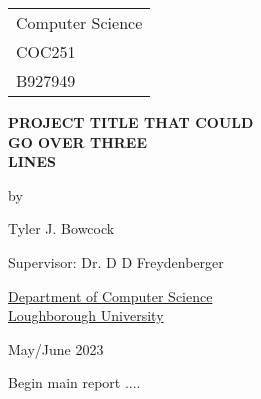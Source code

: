 \documentclass[a4paper]{report}
\begin{document}


\thispagestyle{empty}

\fancypage{}{\fbox}

\begin{center}

\Large{
\hfill \begin{tabular}{l}
Computer Science \\
COC251 \\
B927949
\end{tabular}
}


\vspace*{\fill}

\Large{\textbf{PROJECT TITLE THAT COULD \\
GO OVER THREE \\
LINES}}

\vspace*{\fill}

by

\vspace*{\fill}

Tyler J. Bowcock


\vspace*{\fill}
Supervisor: Dr. D D Freydenberger
\vspace*{\fill}

\underline{Department of Computer Science} \\
\underline{Loughborough University}

\vspace*{\fill}
May/June 2023

\end{center}


\newpage

\fancypage{}{}


Begin main report ....


%


\renewcommand\bibname{References}
%

%
\end{document}
